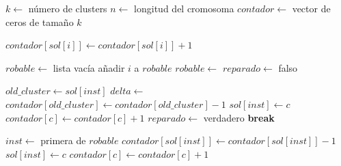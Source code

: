 \documentclass[a4paper,12pt]{article}%
\begin{document}
\begin{algorithm}
	\begin{algorithmic}
		\State $k \leftarrow$ número de clusters
		\State $n \leftarrow$ longitud del cromosoma
		\State $contador \leftarrow$ vector de ceros de tamaño $k$
		
		\State $contador[sol[i]] \leftarrow contador[sol[i]] + 1$
		\EndFor
		
		\State $robable \leftarrow$ lista vacía
		\State añadir $i$ a $robable$
		\EndIf
		\EndFor
		\State $robable \leftarrow$ 
		\State $reparado \leftarrow$ falso
		
		\State $old\_cluster \leftarrow sol[inst]$
		\State $delta \leftarrow$ 
		\State $contador[old\_cluster] \leftarrow contador[old\_cluster] - 1$
		\State $sol[inst] \leftarrow c$
		\State $contador[c] \leftarrow contador[c] + 1$
		\State $reparado \leftarrow$ verdadero
		\State \textbf{break}
		\EndIf
		\EndFor
		
		\State $inst \leftarrow$ primera de $robable$
		\State $contador[sol[inst]] \leftarrow contador[sol[inst]] - 1$
		\State $sol[inst] \leftarrow c$
		\State $contador[c] \leftarrow contador[c] + 1$
		\EndIf
		\EndIf
		\EndFor
		\EndFunction
	\end{algorithmic}
\end{algorithm}


\end{document}

